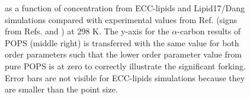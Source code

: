 \documentclass[journal=jpcbfk,manuscript=article]{achemso}
\begin{document}
\begin{figure}[tbp!]
{    as a function of  concentration from ECC-lipids and Lipid17/Dang simulations 
    compared with experimental values from Ref.  (signs from Refs.  and ) at 298 K.
    The y-axis for the $\alpha$-carbon results of POPS (middle right) is transferred
    with the same value for both order parameters such that the lower order
    parameter value from pure POPS is at zero to correctly illustrate the significant forking.
    Error bars are not visible for ECC-lipids simulations because they are smaller than the point size.
  }
\end{figure}
\end{document}
